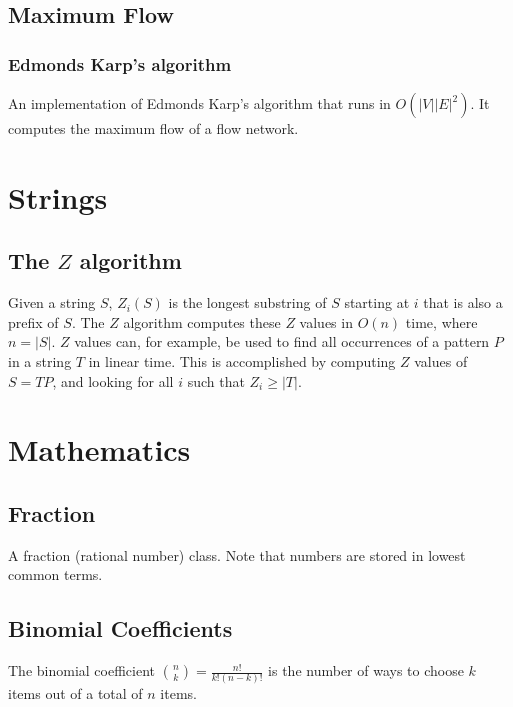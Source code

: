 \documentclass[11pt,a4paper,titlepage]{article}
\begin{document}
		\subsection{Maximum Flow}
			\subsubsection{Edmonds Karp's algorithm}
				An implementation of Edmonds Karp's algorithm that runs in $O(|V||E|^2)$. It computes the maximum flow of a flow network.
				

	\section{Strings}
		\subsection{The $Z$ algorithm}
			Given a string $S$, $Z_i(S)$ is the longest substring of $S$ starting at $i$ that is also a prefix of $S$. The $Z$ algorithm computes these $Z$ values in $O(n)$ time, where $n = |S|$. $Z$ values can, for example, be used to find all occurrences of a pattern $P$ in a string $T$ in linear time. This is accomplished by computing $Z$ values of $S = T P$, and looking for all $i$ such that $Z_i \geq |T|$.

			

	\section{Mathematics}

		\subsection{Fraction}
			A fraction (rational number) class. Note that numbers are stored in lowest common terms.
			

		\subsection{Binomial Coefficients}
			The binomial coefficient $\binom{n}{k} = \frac{n!}{k!(n-k)!}$ is the number of ways to choose $k$ items out of a total of $n$ items.

			

			
\end{document}

